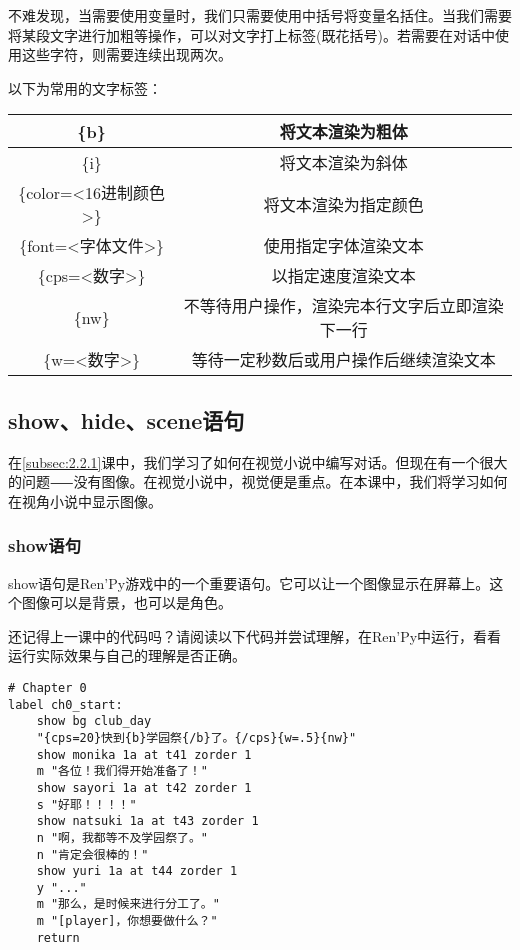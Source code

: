 不难发现，当需要使用变量时，我们只需要使用中括号将变量名括住。当我们需要将某段文字进行加粗等操作，可以对文字打上标签(既花括号)。若需要在对话中使用这些字符，则需要连续出现两次。

以下为常用的文字标签：
\begin{center}
    \tabletail{\hline}
    \tablelasttail{\hline}
    \begin{supertabular}{|c|c|}
        \hline
        \{b\} & 将文本渲染为粗体 \\
        \hline
        \{i\} & 将文本渲染为斜体 \\
        \hline
        \{color=<16进制颜色>\} & 将文本渲染为指定颜色 \\
        \hline
        \{font=<字体文件>\} & 使用指定字体渲染文本 \\
        \hline
        \{cps=<数字>\} & 以指定速度渲染文本 \\
        \hline
        \{nw\} & 不等待用户操作，渲染完本行文字后立即渲染下一行 \\
        \hline
        \{w=<数字>\} & 等待一定秒数后或用户操作后继续渲染文本 \\
        \hline
    \end{supertabular}
    \label{table:3.1.3}
\end{center}

\subsection{show、hide、scene语句}

在\ref{subsec:2.2.1}课中，我们学习了如何在视觉小说中编写对话。但现在有一个很大的问题⸺没有图像。在视觉小说中，视觉便是重点。在本课中，我们将学习如何在视角小说中显示图像。

\subsubsection{show语句}

show语句是Ren'Py游戏中的一个重要语句。它可以让一个图像显示在屏幕上。这个图像可以是背景，也可以是角色。

还记得上一课中的代码吗？请阅读以下代码并尝试理解，在Ren'Py中运行，看看运行实际效果与自己的理解是否正确。

\begin{lstlisting}[caption=script-ch1.rpy, label={lst:2.3}]
# Chapter 0
label ch0_start:
    show bg club_day
    "{cps=20}快到{b}学园祭{/b}了。{/cps}{w=.5}{nw}"
    show monika 1a at t41 zorder 1
    m "各位！我们得开始准备了！"
    show sayori 1a at t42 zorder 1
    s "好耶！！！！"
    show natsuki 1a at t43 zorder 1
    n "啊，我都等不及学园祭了。"
    n "肯定会很棒的！"
    show yuri 1a at t44 zorder 1
    y "..."
    m "那么，是时候来进行分工了。"
    m "[player]，你想要做什么？"
    return
\end{lstlisting}

